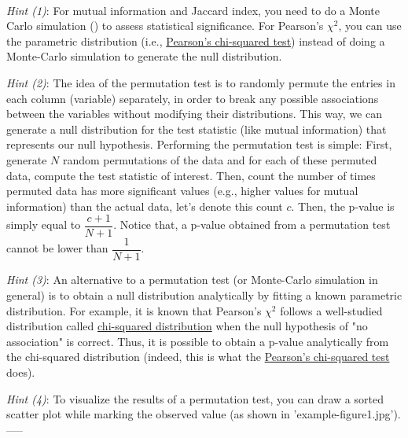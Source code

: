 \noindent
\\
\textit{Hint (1)}: For mutual information and Jaccard index, you need to do a Monte Carlo simulation () to assess statistical significance. For Pearson's $\chi^2$, you can use the parametric distribution (i.e., \href{https://en.wikipedia.org/wiki/Pearson\%27s_chi-squared_test\#Testing\_for\_statistical_independence}{Pearson's chi-squared test}) instead of doing a Monte-Carlo simulation to generate the null distribution.

\vspace{0.15cm}
\noindent
\textit{Hint (2)}: The idea of the permutation test is to randomly permute the entries in each column (variable) separately, in order to break any possible associations between the variables without modifying their distributions. This way, we can generate a null distribution for the test statistic (like mutual information) that represents our null hypothesis. Performing the permutation test is simple: First, generate $N$ random permutations of the data and for each of these permuted data, compute the test statistic of interest. Then, count the number of times permuted data has more significant values (e.g., higher values for mutual information) than the actual data, let's denote this count $c$. Then, the p-value is simply equal to $\dfrac{c+1}{N+1}$. Notice that, a p-value obtained from a permutation test cannot be lower than $\dfrac{1}{N+1}$. %

\vspace{0.25cm}
\noindent
\textit{Hint (3)}: An alternative to a permutation test (or Monte-Carlo simulation in general) is to obtain a null distribution analytically by fitting a known parametric distribution. For example, it is known that Pearson's $\chi^2$ follows a well-studied distribution called \href{https://en.wikipedia.org/wiki/Chi-squared_distribution}{chi-squared distribution} when the null hypothesis of "no association" is correct. Thus, it is possible to obtain a p-value analytically from the chi-squared distribution (indeed, this is what the \href{https://en.wikipedia.org/wiki/Pearson\%27s_chi-squared_test\#Testing\_for\_statistical_independence}{Pearson's chi-squared test} does). %

\vspace{0.25cm}
\noindent
\textit{Hint (4)}: To visualize the results of a permutation test, you can draw a sorted scatter plot while marking the observed value (as shown in 'example-figure1.jpg').\\
-----\\

